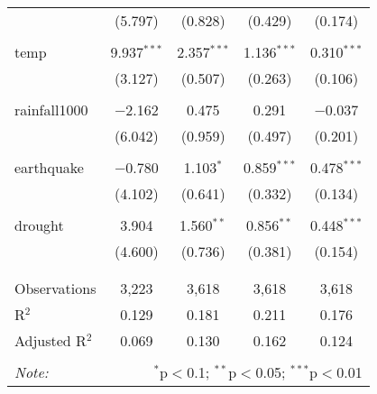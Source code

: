 \begin{table}[!htbp]
\begin{tabular}{@{\extracolsep{5pt}}lcccc}
  & (5.797) & (0.828) & (0.429) & (0.174) \\ 
  & & & & \\ 
 temp & 9.937$^{***}$ & 2.357$^{***}$ & 1.136$^{***}$ & 0.310$^{***}$ \\ 
  & (3.127) & (0.507) & (0.263) & (0.106) \\ 
  & & & & \\ 
 rainfall1000 & $-$2.162 & 0.475 & 0.291 & $-$0.037 \\ 
  & (6.042) & (0.959) & (0.497) & (0.201) \\ 
  & & & & \\ 
 earthquake & $-$0.780 & 1.103$^{*}$ & 0.859$^{***}$ & 0.478$^{***}$ \\ 
  & (4.102) & (0.641) & (0.332) & (0.134) \\ 
  & & & & \\ 
 drought & 3.904 & 1.560$^{**}$ & 0.856$^{**}$ & 0.448$^{***}$ \\ 
  & (4.600) & (0.736) & (0.381) & (0.154) \\ 
  & & & & \\ 
\hline \\[-1.8ex] 
Observations & 3,223 & 3,618 & 3,618 & 3,618 \\ 
R$^{2}$ & 0.129 & 0.181 & 0.211 & 0.176 \\ 
Adjusted R$^{2}$ & 0.069 & 0.130 & 0.162 & 0.124 \\ 
\hline 
\hline \\[-1.8ex] 
\textit{Note:}  & \multicolumn{4}{r}{$^{*}$p$<$0.1; $^{**}$p$<$0.05; $^{***}$p$<$0.01} \\ 
\end{tabular} 
\end{table} 
